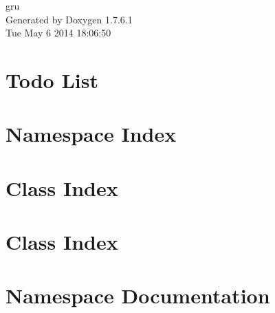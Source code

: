 \documentclass[a4paper]{book}
\begin{document}
\hypersetup{pageanchor=false,citecolor=blue}
\begin{titlepage}
\vspace*{7cm}
\begin{center}
{\Large gru }\\
\vspace*{1cm}
{\large \-Generated by Doxygen 1.7.6.1}\\
\vspace*{0.5cm}
{\small Tue May 6 2014 18:06:50}\\
\end{center}
\end{titlepage}
\clearemptydoublepage
{}
\tableofcontents
\clearemptydoublepage
{}
\hypersetup{pageanchor=true,citecolor=blue}
\chapter{\-Todo \-List}
\label{todo}
\hypertarget{todo}{}

\chapter{\-Namespace \-Index}

\chapter{\-Class \-Index}

\chapter{\-Class \-Index}

\chapter{\-Namespace \-Documentation}







\end{document}
